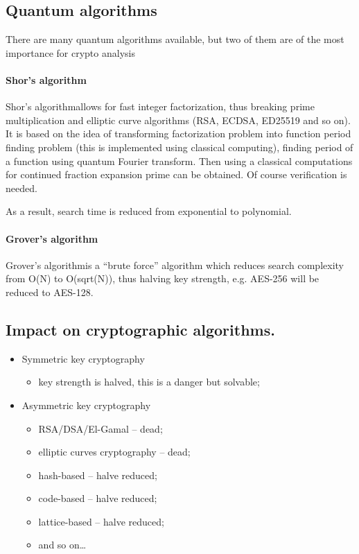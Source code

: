 \documentclass[10pt, a5paper]{article}
\begin{document}
\subsection*{Quantum algorithms}

There are many quantum algorithms available, but two of them are of the most importance for crypto analysis

\paragraph{Shor's algorithm}

Shor's algorithm\footnotemark[2] allows for fast integer factorization, thus breaking prime multiplication and elliptic curve algorithms (RSA, ECDSA, ED25519 and so on). It is based on the idea of transforming factorization problem into function period finding problem (this is implemented using classical computing), finding period of a function using quantum Fourier transform. Then using a classical computations for continued fraction expansion prime can be obtained. Of course verification is needed.

As a result, search time is reduced from exponential to polynomial.

\paragraph{Grover's algorithm}

Grover's algorithm\footnotemark[3] is a ``brute force'' algorithm which reduces search complexity from O(N) to O(sqrt(N)), thus halving key strength, e.g. AES-256 will be reduced to AES-128.

\subsection*{Impact on cryptographic algorithms.}

\begin{itemize}
  \item Symmetric key cryptography\begin{itemize}
  \item key strength is halved, this is a danger but solvable;
\end{itemize}


  \item Asymmetric key cryptography\begin{itemize}
  \item RSA/DSA/El-Gamal -- dead;
  \item elliptic curves cryptography -- dead;
  \item hash-based -- halve reduced;
  \item code-based -- halve reduced;
  \item lattice-based -- halve reduced;
  \item and so on\ldots{}
\end{itemize}


\end{itemize}
\end{document}
